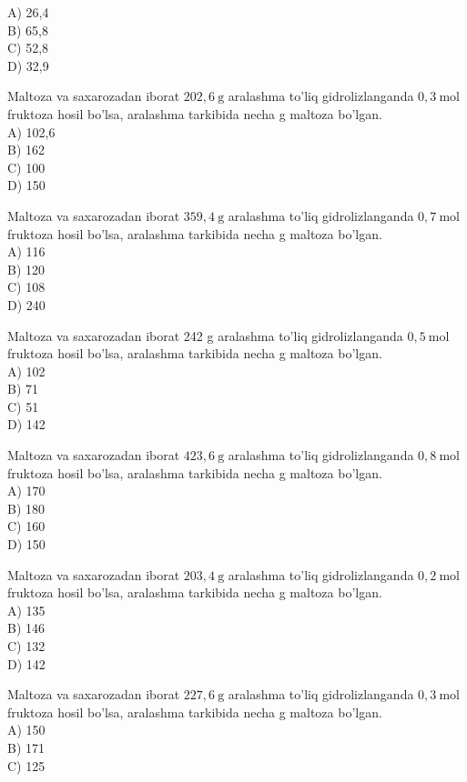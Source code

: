 A) 26,4\\
B) 65,8\\
C) 52,8\\
D) 32,9
  \item Maltoza va saxarozadan iborat $202,6 \mathrm{~g}$ aralashma to'liq gidrolizlanganda $0,3 \mathrm{~mol}$ fruktoza hosil bo'lsa, aralashma tarkibida necha g maltoza bo'lgan.\\
A) 102,6\\
B) 162\\
C) 100\\
D) 150
  \item Maltoza va saxarozadan iborat $359,4 \mathrm{~g}$ aralashma to'liq gidrolizlanganda $0,7 \mathrm{~mol}$ fruktoza hosil bo'lsa, aralashma tarkibida necha g maltoza bo'lgan.\\
A) 116\\
B) 120\\
C) 108\\
D) 240
  \item Maltoza va saxarozadan iborat 242 g aralashma to'liq gidrolizlanganda $0,5 \mathrm{~mol}$ fruktoza hosil bo'lsa, aralashma tarkibida necha g maltoza bo'lgan.\\
A) 102\\
B) 71\\
C) 51\\
D) 142
  \item Maltoza va saxarozadan iborat $423,6 \mathrm{~g}$ aralashma to'liq gidrolizlanganda $0,8 \mathrm{~mol}$ fruktoza hosil bo'lsa, aralashma tarkibida necha g maltoza bo'lgan.\\
A) 170\\
B) 180\\
C) 160\\
D) 150
  \item Maltoza va saxarozadan iborat $203,4 \mathrm{~g}$ aralashma to'liq gidrolizlanganda $0,2 \mathrm{~mol}$ fruktoza hosil bo'lsa, aralashma tarkibida necha g maltoza bo'lgan.\\
A) 135\\
B) 146\\
C) 132\\
D) 142
  \item Maltoza va saxarozadan iborat $227,6 \mathrm{~g}$ aralashma to'liq gidrolizlanganda $0,3 \mathrm{~mol}$ fruktoza hosil bo'lsa, aralashma tarkibida necha g maltoza bo'lgan.\\
A) 150\\
B) 171\\
C) 125\\
